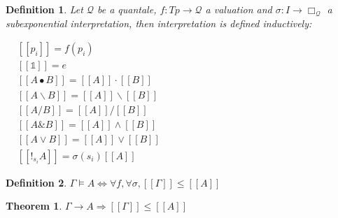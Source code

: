 \documentclass[a4paper]{article}
\newtheorem{theorem}{Theorem}
\newtheorem{defin}{Definition}
\begin{document}
\begin{defin} Let $\mathcal{Q}$ be a quantale, $f : Tp \to \mathcal{Q}$ a valuation and $\sigma : I \to \Box_{\mathcal{Q}}$ a subexponential interpretation, then
  interpretation is defined inductively:

\begin{center}
$\begin{array}{lll}
& [\![p_i]\!] = f(p_i)&\\
& [\![\mathds{1}]\!] = e & \\
&[\![A \bullet B]\!] = [\![A]\!] \cdot [\![B]\!] & \\
&[\![A \backslash B]\!] = [\![A]\!] \backslash [\![B]\!] & \\
&[\![A / B]\!] = [\![A]\!] / [\![B]\!]& \\
&[\![A \& B]\!] = [\![A]\!] \wedge [\![B]\!]& \\
&[\![A \vee B]\!] = [\![A]\!] \vee [\![B]\!]& \\
&[\![!_{s_i} A]\!] = \sigma(s_i) [\![A]\!]&
\end{array}$
\end{center}
\end{defin}

\begin{defin}
  $\Gamma \models A \Leftrightarrow \forall f, \forall \sigma, [\![\Gamma]\!] \leq [\![A]\!]$
\end{defin}

\begin{theorem}
  $\Gamma \rightarrow A \Rightarrow [\![\Gamma]\!] \leq [\![A]\!]$
\end{theorem}
\end{document}
